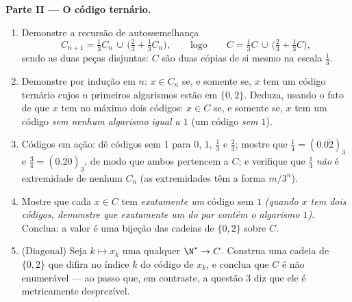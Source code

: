\begin{problem}[{Problema de fim de semana --- o \omterm{pb:b1:topology:1}{conjunto de Cantor}
dos terços médios: comprimento zero, não enumerável, perfeito e $C + C =
\intcc{0}{2}$}]
\medskip
\noindent\textbf{Parte II --- O código ternário.}
\begin{enumerate}
  \item Demonstre a recursão de autossemelhança
        \[
        C_{n+1} = \tfrac13 C_n \,\cup\,
        \bigl(\tfrac23 + \tfrac13 C_n\bigr),
        \qquad\text{logo}\qquad
        C = \tfrac13 C \,\cup\, \bigl(\tfrac23 + \tfrac13
        C\bigr),
        \]
        sendo as duas peças disjuntas: $C$ são duas cópias de si
        mesmo na escala $\frac13$.
  \item Demonstre por indução em $n$: $x \in C_n$ se, e somente se,
        $x$ tem um código ternário cujos $n$ primeiros algarismos estão
        em $\{0, 2\}$. Deduza, usando o fato de que $x$ tem no máximo
        dois códigos: $x \in C$ se, e somente se, $x$ tem um código
        \emph{sem nenhum algarismo igual a $1$} (um código
        \emph{sem $1$}).
  \item Códigos em ação: dê códigos sem $1$ para $0$, $1$,
        $\frac13$ e $\frac23$; mostre que $\frac14 = (0.\overline{02})_3$
        e $\frac34 = (0.\overline{20})_3$, de modo que ambos pertencem a
        $C$; e verifique que $\frac14$ \emph{não} é extremidade
        de nenhum $C_n$ (as extremidades têm a forma $m/3^n$).
  \item Mostre que cada $x \in C$ tem \emph{exatamente um} código
        sem $1$ \emph{(quando $x$ tem dois códigos, demonstre que
        exatamente um do par contém o algarismo $1$)}. Conclua: a
         valor é uma bijeção das cadeias de $\{0,2\}$ sobre
        $C$.
  \item (Diagonal) Seja $k \mapsto x_k$ uma  qualquer $\N^* \to C$.
        Construa uma cadeia de $\{0, 2\}$ que difira no índice $k$ do
        código de $x_k$, e conclua que $C$ é não enumerável
        --- ao passo que, em contraste, a questão 3 diz que ele é
        metricamente desprezível.
\end{enumerate}


\end{problem}
